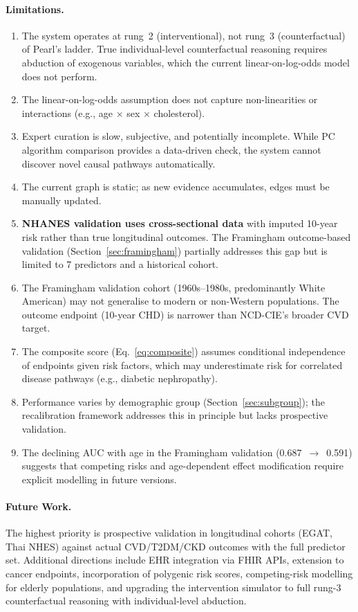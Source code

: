 \documentclass[runningheads]{llncs}
\begin{document}
\paragraph{Limitations.}
\begin{enumerate}
\item The system operates at rung~2 (interventional), not rung~3
  (counterfactual) of Pearl's ladder.  True individual-level
  counterfactual reasoning requires abduction of exogenous variables,
  which the current linear-on-log-odds model does not perform.
\item The linear-on-log-odds assumption does not capture non-linearities
  or interactions (e.g., age $\times$ sex $\times$ cholesterol).
\item Expert curation is slow, subjective, and potentially incomplete.
  While PC algorithm comparison provides a data-driven check, the system
  cannot discover novel causal pathways automatically.
\item The current graph is static; as new evidence accumulates, edges
  must be manually updated.
\item \textbf{NHANES validation uses cross-sectional data} with imputed
  10-year risk rather than true longitudinal outcomes.  The Framingham
  outcome-based validation (Section~\ref{sec:framingham}) partially
  addresses this gap but is limited to 7 predictors and a historical
  cohort.
\item The Framingham validation cohort (1960s--1980s, predominantly
  White American) may not generalise to modern or non-Western
  populations.  The outcome endpoint (10-year CHD) is narrower than
  NCD-CIE's broader CVD target.
\item The composite score (Eq.~\ref{eq:composite}) assumes conditional
  independence of endpoints given risk factors, which may underestimate
  risk for correlated disease pathways (e.g., diabetic nephropathy).
\item Performance varies by demographic group
  (Section~\ref{sec:subgroup}); the recalibration framework addresses
  this in principle but lacks prospective validation.
\item The declining AUC with age in the Framingham validation
  (0.687~$\rightarrow$~0.591) suggests that competing risks and
  age-dependent effect modification require explicit modelling in
  future versions.
\end{enumerate}

\paragraph{Future Work.}
The highest priority is prospective validation in longitudinal cohorts
(EGAT, Thai NHES) against actual CVD/T2DM/CKD outcomes with the full
predictor set.  Additional
directions include EHR integration via FHIR APIs, extension to cancer
endpoints, incorporation of polygenic risk scores, competing-risk
modelling for elderly populations, and upgrading the
intervention simulator to full rung-3 counterfactual reasoning with
individual-level abduction.
\end{document}
